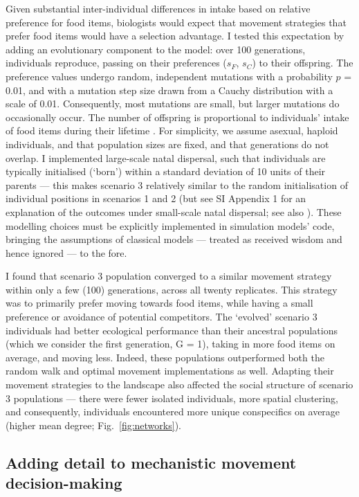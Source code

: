 Given substantial inter-individual differences in intake based on relative preference for food items, biologists would expect that movement strategies that prefer food items would have a selection advantage.
I tested this expectation by adding an evolutionary component to the model: over 100 generations, individuals reproduce, passing on their preferences ($s_F$, $s_C$) to their offspring.
The preference values undergo random, independent mutations with a probability $p$ = 0.01, and with a mutation step size drawn from a Cauchy distribution with a scale of 0.01.
Consequently, most mutations are small, but larger mutations do occasionally occur.
The number of offspring is proportional to individuals' intake of food items during their lifetime \citep{netz2021,gupte2021a,gupte2022c}.
For simplicity, we assume asexual, haploid individuals, and that population sizes are fixed, and that generations do not overlap.
I implemented large-scale natal dispersal, such that individuals are typically initialised (`born') within a standard deviation of 10 units of their parents --- this makes scenario 3 relatively similar to the random initialisation of individual positions in scenarios 1 and 2 (but see SI Appendix 1 for an explanation of the outcomes under small-scale natal dispersal; see also \cite{gupte2021a,gupte2022c}).
These modelling choices must be explicitly implemented in simulation models' code, bringing the assumptions of classical models --- treated as received wisdom and hence ignored --- to the fore.

I found that scenario 3 population converged to a similar movement strategy within only a few (100) generations, across all twenty replicates.
This strategy was to primarily prefer moving towards food items, while having a small preference or avoidance of potential competitors.
The `evolved' scenario 3 individuals had better ecological performance than their ancestral populations (which we consider the first generation, G = 1), taking in more food items on average, and moving less.
Indeed, these populations outperformed both the random walk and optimal movement implementations as well.
Adapting their movement strategies to the landscape also affected the social structure of scenario 3 populations --- there were fewer isolated individuals, more spatial clustering, and consequently, individuals encountered more unique conspecifics on average (higher mean degree; Fig.~\ref{fig:networks}).

\subsection*{Adding detail to mechanistic movement decision-making}

